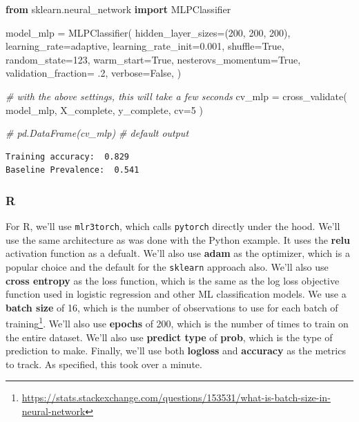 \documentclass[
  letterpaper,
]{krantz}
\newenvironment{Shaded}{}{}
\newcommand{\CommentTok}[1]{\textcolor[rgb]{0.38,0.63,0.69}{\textit{#1}}}
\newcommand{\DecValTok}[1]{\textcolor[rgb]{0.25,0.63,0.44}{#1}}
\newcommand{\FloatTok}[1]{\textcolor[rgb]{0.25,0.63,0.44}{#1}}
\newcommand{\ImportTok}[1]{\textcolor[rgb]{0.00,0.50,0.00}{\textbf{#1}}}
\newcommand{\NormalTok}[1]{#1}
\newcommand{\OperatorTok}[1]{\textcolor[rgb]{0.40,0.40,0.40}{#1}}
\newcommand{\StringTok}[1]{\textcolor[rgb]{0.25,0.44,0.63}{#1}}
\newcommand{\VariableTok}[1]{\textcolor[rgb]{0.10,0.09,0.49}{#1}}
\DeclareRobustCommand{\href}[2]{#2\footnote{\url{#1}}}
\begin{document}
\begin{Shaded}
\begin{Highlighting}[]
\ImportTok{from}\NormalTok{ sklearn.neural\_network }\ImportTok{import}\NormalTok{ MLPClassifier}

\NormalTok{model\_mlp }\OperatorTok{=}\NormalTok{ MLPClassifier(}
\NormalTok{    hidden\_layer\_sizes}\OperatorTok{=}\NormalTok{(}\DecValTok{200}\NormalTok{, }\DecValTok{200}\NormalTok{, }\DecValTok{200}\NormalTok{),  }
\NormalTok{    learning\_rate}\OperatorTok{=}\StringTok{\textquotesingle{}adaptive\textquotesingle{}}\NormalTok{,}
\NormalTok{    learning\_rate\_init}\OperatorTok{=}\FloatTok{0.001}\NormalTok{,}
\NormalTok{    shuffle}\OperatorTok{=}\VariableTok{True}\NormalTok{,}
\NormalTok{    random\_state}\OperatorTok{=}\DecValTok{123}\NormalTok{,}
\NormalTok{    warm\_start}\OperatorTok{=}\VariableTok{True}\NormalTok{,}
\NormalTok{    nesterovs\_momentum}\OperatorTok{=}\VariableTok{True}\NormalTok{,}
\NormalTok{    validation\_fraction}\OperatorTok{=} \FloatTok{.2}\NormalTok{,}
\NormalTok{    verbose}\OperatorTok{=}\VariableTok{False}\NormalTok{,}
\NormalTok{)}

\CommentTok{\# with the above settings, this will take a few seconds}
\NormalTok{cv\_mlp }\OperatorTok{=}\NormalTok{ cross\_validate(}
\NormalTok{  model\_mlp, }
\NormalTok{  X\_complete, }
\NormalTok{  y\_complete, }
\NormalTok{  cv}\OperatorTok{=}\DecValTok{5}
\NormalTok{) }

\CommentTok{\# pd.DataFrame(cv\_mlp) \# default output}
\end{Highlighting}
\end{Shaded}

\begin{verbatim}
Training accuracy:  0.829 
Baseline Prevalence:  0.541
\end{verbatim}

\subsubsection{R}

For R, we'll use \texttt{mlr3torch}, which calls \texttt{pytorch}
directly under the hood. We'll use the same architecture as was done
with the Python example. It uses the \textbf{relu} activation function
as a defualt. We'll also use \textbf{adam} as the optimizer, which is a
popular choice and the default for the \texttt{sklearn} approach also.
We'll also use \textbf{cross entropy} as the loss function, which is the
same as the log loss objective function used in logistic regression and
other ML classification models. We use a \textbf{batch size} of 16,
which is the number of observations to use for each
\href{https://stats.stackexchange.com/questions/153531/what-is-batch-size-in-neural-network}{batch
of training}. We'll also use \textbf{epochs} of 200, which is the number
of times to train on the entire dataset. We'll also use \textbf{predict
type} of \textbf{prob}, which is the type of prediction to make.
Finally, we'll use both \textbf{logloss} and \textbf{accuracy} as the
metrics to track. As specified, this took over a minute.
\end{document}
